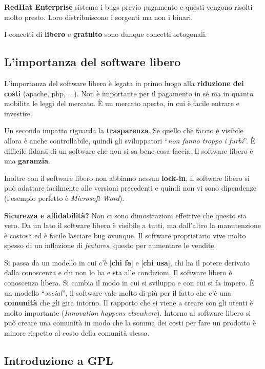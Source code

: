 \textbf{RedHat Enterprise} sistema i bugs previo pagamento e questi vengono risolti molto presto. Loro distribuiscono i sorgenti ma non i binari.

I concetti di \textbf{libero} e \textbf{gratuito} sono dunque concetti ortogonali.

\subsection{L'importanza del software libero}

L'importanza del software libero è legata in primo luogo alla \textbf{riduzione dei costi} (apache, php, ...). Non è importante per il pagamento in sé ma in quanto mobilita le leggi del mercato. È un mercato aperto, in cui è facile entrare e investire.

Un secondo impatto riguarda la \textbf{trasparenza}. Se quello che faccio è visibile allora è anche controllabile, quindi gli sviluppatori ``\textit{non fanno troppo i furbi}''. È difficile fidarsi di un software che non si sa bene cosa faccia. Il software libero è una \textbf{garanzia}.

Inoltre con il software libero non abbiamo nessun \textbf{lock-in}, il software libero si può adattare facilmente alle versioni precedenti e quindi non vi sono dipendenze (l'esempio perfetto è \textit{Microsoft Word}).

\textbf{Sicurezza e affidabilità?} Non ci sono dimostrazioni effettive che questo sia vero. Da un lato il software libero è visibile a tutti, ma dall'altro la manutenzione è costosa ed è facile lasciare bug ovunque. Il software proprietario vive molto spesso di un inflazione di \textit{features}, questo per aumentare le vendite.


Si passa da un modello in cui c'è [\textbf{chi fa}] e [\textbf{chi usa}], chi ha il potere derivato dalla conoscenza e chi non lo ha e sta alle condizioni. Il software libero è conoscenza libera. Si cambia il modo in cui si sviluppa e con cui si fa impero. È un modello ``\textit{social}'', il software vale molto di più per il fatto che c'è una \textbf{comunità} che gli gira intorno. Il rapporto che si viene a creare con gli utenti è molto importante (\textit{Innovation happens elsewhere}). Intorno al software libero si può creare una comunità in modo che la somma dei costi per fare un prodotto è minore rispetto al costo della comunità stessa.

\subsection{Introduzione a GPL}

